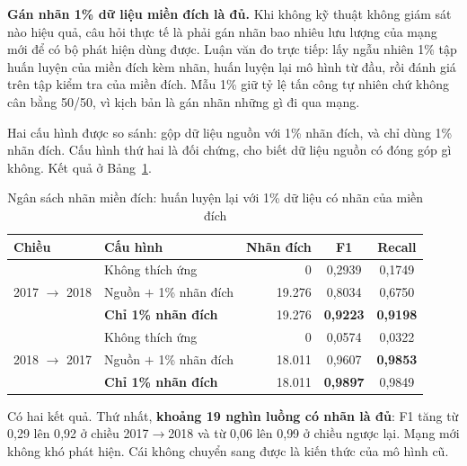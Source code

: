 \textbf{Gán nhãn 1\% dữ liệu miền đích là đủ.} Khi không kỹ thuật không giám sát nào hiệu quả, câu hỏi thực tế là phải gán nhãn bao nhiêu lưu lượng của mạng mới để có bộ phát hiện dùng được. Luận văn đo trực tiếp: lấy ngẫu nhiên 1\% tập huấn luyện của miền đích kèm nhãn, huấn luyện lại mô hình từ đầu, rồi đánh giá trên tập kiểm tra của miền đích. Mẫu 1\% giữ tỷ lệ tấn công tự nhiên chứ không cân bằng 50/50, vì kịch bản là gán nhãn những gì đi qua mạng.

Hai cấu hình được so sánh: gộp dữ liệu nguồn với 1\% nhãn đích, và chỉ dùng 1\% nhãn đích. Cấu hình thứ hai là đối chứng, cho biết dữ liệu nguồn có đóng góp gì không. Kết quả ở Bảng~\ref{tab:label_budget}.

\begin{table}[htbp]
\centering
\caption[Ngân sách nhãn miền đích: 1\% đủ để phục hồi hiệu năng]{Ngân sách nhãn miền đích: huấn luyện lại với 1\% dữ liệu có nhãn của miền đích}
\label{tab:label_budget}
\begin{tabular*}{\textwidth}{@{\extracolsep{\fill}}llrcc@{}}
\toprule
\textbf{Chiều} & \textbf{Cấu hình} & \textbf{Nhãn đích} & \textbf{F1} & \textbf{Recall} \\ \midrule
\multirow{3}{*}{2017 $\rightarrow$ 2018}
 & Không thích ứng & 0 & 0{,}2939 & 0{,}1749 \\
 & Nguồn $+$ 1\% nhãn đích & 19.276 & 0{,}8034 & 0{,}6750 \\
 & \textbf{Chỉ 1\% nhãn đích} & 19.276 & \textbf{0{,}9223} & \textbf{0{,}9198} \\ \midrule
\multirow{3}{*}{2018 $\rightarrow$ 2017}
 & Không thích ứng & 0 & 0{,}0574 & 0{,}0322 \\
 & Nguồn $+$ 1\% nhãn đích & 18.011 & 0{,}9607 & \textbf{0{,}9853} \\
 & \textbf{Chỉ 1\% nhãn đích} & 18.011 & \textbf{0{,}9897} & 0{,}9849 \\ \bottomrule
\end{tabular*}
\end{table}

Có hai kết quả. Thứ nhất, \textbf{khoảng 19 nghìn luồng có nhãn là đủ}: F1 tăng từ 0{,}29 lên 0{,}92 ở chiều 2017$\rightarrow$2018 và từ 0{,}06 lên 0{,}99 ở chiều ngược lại. Mạng mới không khó phát hiện. Cái không chuyển sang được là kiến thức của mô hình cũ.

